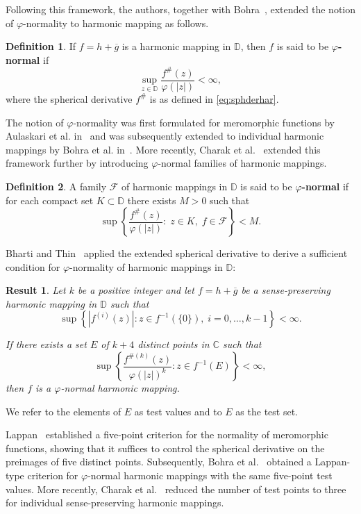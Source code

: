 \documentclass[11pt, reqno]{amsart}
\numberwithin{equation}{section}
\theoremstyle{definition}
\newtheorem{definition}{Definition}[section]
\theoremstyle{remark}
\theoremstyle{plain}
\newtheorem{result}{Result}[section]
\begin{document}
  Following this framework, the authors, together with Bohra~\cite{Bohra},
  extended the notion of 
  $\varphi$-normality to harmonic mapping as follows.
\begin{definition}\cite[Definition 1.2]{Bohra}
    If $f=h+\overline{g}$ is
    a harmonic mapping in $\mathbb{D}$,
      then $f$ is said to be
   {\bf $\varphi$-normal} if
  \[
  \sup_{z\in\mathbb{D}}\frac{f^\#(z)}{\varphi(|z|)}<\infty,
  \]
  where the spherical derivative $f^\#$ is as defined in \eqref{eq:sphderhar}.

\end{definition}


The notion of $\varphi$-normality was first formulated for
meromorphic functions by Aulaskari et al. in~\cite{Aulaskari} and was subsequently 
extended to individual
harmonic mappings by Bohra et al. in~\cite{Bohra}. More recently, Charak et 
al.~\cite{charakbharti} extended
this framework further by introducing $\varphi$-normal families of
harmonic mappings.

\begin{definition}\cite[Definition 1.9]{charakbharti}
A family $\mathcal{F}$ of harmonic mappings in 
$\mathbb{D}$ is said to be
{\bf $\varphi$-normal} if for each compact set
$K\subset\mathbb{D}$ there exists $M>0$ such that
\[
\sup\left\{
\frac{f^{\#}(z)}{\varphi(|z|)}
:\;
z\in K,\;
f\in\mathcal{F}
\right\}
<M.
\]
\end{definition}

Bharti and Thin~\cite{bharatithin} applied the extended spherical 
derivative to derive a sufficient condition for  $\varphi$-normality 
of harmonic mappings in $\mathbb{D}$:
\begin{result}\label{Bharatik2}\cite[Theorem 1.8]{bharatithin}
  Let $k$ be a positive integer and let $f=h+\overline{g}$ be a 
  sense-preserving harmonic mapping in $\mathbb{D}$ such that
  \[\sup\left\{
|f^{(i)}(z)|:
z\in f^{-1}(\{0\}), \;
i=0,\ldots,k-1
\right\}<\infty.\]

If there exists a set $E$ of $k+4$ distinct points in $\mathbb{C}$
such that \[\sup\left\{
\frac{f^{\#(k)}(z)}{\varphi(|z|)^k}
:
z\in f^{-1}(E)
\right\}
<\infty,\] then $f$ is a $\varphi$-normal harmonic mapping.
\end{result} 
We refer to the elements of $E$ as test values and to $E$ as the test set.
\smallskip

Lappan~\cite[Theorem 1]{Lappan1974} established a five-point criterion for the 
normality of meromorphic functions, showing that it suffices to control the
 spherical derivative on the preimages of five distinct points. Subsequently,
 Bohra et al.~\cite[Theorem 5]{Bohra} obtained a Lappan-type criterion for 
$\varphi$-normal harmonic mappings with the same five-point test values. More recently, 
Charak et al.~\cite{charakbharti} reduced the number of test points to three 
for individual sense-preserving harmonic mappings.
\end{document}
